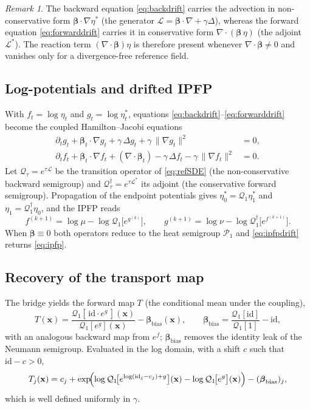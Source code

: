\documentclass[11pt]{article}
\theoremstyle{remark}
\newtheorem{remark}{Remark}
\newcommand{\xv}{\mathbf{x}}
\newcommand{\bt}{\boldsymbol{\beta}}
\newcommand{\grad}{\nabla}
\newcommand{\dive}{\grad\!\cdot\!}
\begin{document}
\begin{remark}
The backward equation \eqref{eq:backdrift} carries the advection in
non-conservative form $\bt\cdot\grad\eta^\ast$ (the generator
$\mathcal{L}=\bt\cdot\grad+\gamma\Delta$), whereas the forward equation
\eqref{eq:forwarddrift} carries it in conservative form $\dive(\bt\,\eta)$
(the adjoint $\mathcal{L}^\ast$). The reaction term $(\dive\bt)\eta$ is therefore
present whenever $\dive\bt\neq0$ and vanishes only for a divergence-free
reference field.
\end{remark}

\subsection{Log-potentials and drifted IPFP}
With $f_t=\log\eta_t$ and $g_t=\log\eta^\ast_t$, equations
\eqref{eq:backdrift}--\eqref{eq:forwarddrift} become the coupled
Hamilton--Jacobi equations
\begin{align}
\partial_t g_t+\bt_t\cdot\grad g_t+\gamma\,\Delta g_t+\gamma\,\|\grad g_t\|^2&=0,\\
\partial_t f_t+\bt_t\cdot\grad f_t+(\dive\bt_t)-\gamma\,\Delta f_t-\gamma\,\|\grad f_t\|^2&=0.
\end{align}
Let $\mathcal{Q}_\tau=e^{\tau\mathcal{L}}$ be the transition operator of
\eqref{eq:refSDE} (the non-conservative backward semigroup) and
$\mathcal{Q}^{\dagger}_\tau=e^{\tau\mathcal{L}^\ast}$ its adjoint (the
conservative forward semigroup). Propagation of the endpoint potentials gives
$\eta^\ast_0=\mathcal{Q}_1\eta^\ast_1$ and $\eta_1=\mathcal{Q}^{\dagger}_1\eta_0$,
and the IPFP reads
\begin{equation}
\label{eq:ipfpdrift}
f^{(k+1)}=\log\mu-\log\mathcal{Q}_1\!\bigl[e^{g^{(k)}}\bigr],
\qquad
g^{(k+1)}=\log\nu-\log\mathcal{Q}^{\dagger}_1\!\bigl[e^{f^{(k+1)}}\bigr].
\end{equation}
When $\bt\equiv0$ both operators reduce to the heat semigroup $\mathcal{P}_1$ and
\eqref{eq:ipfpdrift} returns \eqref{eq:ipfp}.

\subsection{Recovery of the transport map}
The bridge yields the forward map $T$ (the conditional mean under the coupling),
\begin{equation}
\label{eq:baryT}
T(\xv)=\frac{\mathcal{Q}_1[\,\mathrm{id}\cdot e^{g}\,](\xv)}{\mathcal{Q}_1[e^{g}](\xv)}-\boldsymbol{\beta}_{\mathrm{bias}}(\xv),
\qquad
\boldsymbol{\beta}_{\mathrm{bias}}=\frac{\mathcal{Q}_1[\mathrm{id}]}{\mathcal{Q}_1[1]}-\mathrm{id},
\end{equation}
with an analogous backward map from $e^{f}$; $\boldsymbol{\beta}_{\mathrm{bias}}$
removes the identity leak of the Neumann semigroup. Evaluated in the log domain,
with a shift $c$ such that $\mathrm{id}-c>0$,
\begin{equation}
T_j(\xv)=c_j+\exp\!\Bigl(\log\mathcal{Q}_1\!\bigl[e^{\log(\mathrm{id}_j-c_j)+g}\bigr](\xv)-\log\mathcal{Q}_1\!\bigl[e^{g}\bigr](\xv)\Bigr)-(\boldsymbol{\beta}_{\mathrm{bias}})_j ,
\end{equation}
which is well defined uniformly in $\gamma$.
\end{document}

